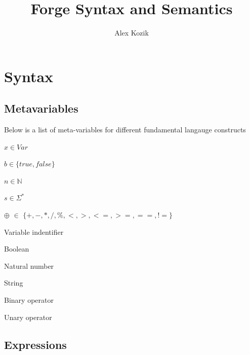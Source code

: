 \documentclass[titlepage]{article}
\title{Forge Syntax and Semantics}
\author{Alex Kozik}
\begin{document}
\large
\newcommand{\desc}[1]{\textit{\textcolor{Aquamarine}{#1}}}



\maketitle
\tableofcontents
\newpage

\section{Syntax}

\subsection{Metavariables}

Below is a list of meta-variables for different fundamental langauge constructs

\begin{minipage}[t]{0.4\textwidth}



$x \in  Var$

$b \in \{true, false\}$

$n \in \mathbb{N}$

$s \in \Sigma ^ *$

$\oplus$ $\in$ $\{+, -, *, /, \%, <, >, <=, >=, ==, !=\}$


\end{minipage}
\begin{minipage}[t]{0.6\textwidth}
Variable indentifier

Boolean

Natural number

String

Binary operator

Unary operator

\end{minipage}
\subsection{Expressions}
\end{document}
